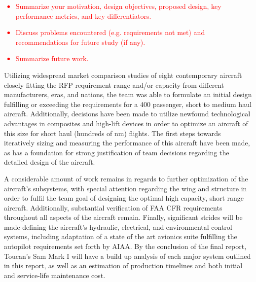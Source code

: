 \textcolor{red}{
\begin{itemize}
    \item Summarize your motivation, design objectives, proposed design, key performance metrics, and key differentiators. 
    \item Discuss problems encountered (e.g. requirements not met) and recommendations for future study (if any). 
    \item Summarize future work. 
\end{itemize}}

Utilizing widespread market comparison studies of eight contemporary aircraft closely fitting the RFP requirement range and/or capacity from different manufacturers, eras, and nations, the team was able to formulate an initial design fulfilling or exceeding the requirements for a 400 passenger, short to medium haul aircraft. Additionally, decisions have been made to utilize newfound technological advantages in composites and high-lift devices in order to optimize  an aircraft of this size for short haul (hundreds of nm) flights.  The first steps towards iteratively sizing and measuring the performance of this aircraft have been made, as has a foundation for strong justification of team decisions regarding the detailed design of the aircraft.

A considerable amount of work remains in regards to further optimization of the aircraft's subsystems, with special attention regarding the wing and structure in order to fulfil the team goal of designing the optimal high capacity, short range aircraft.  Additionally, substantial verification of FAA CFR requirements throughout all aspects of the aircraft remain.  Finally, significant strides will be made defining the aircraft's hydraulic, electrical, and environmental control systems, including adaptation of a state of the art avionics suite fulfilling the autopilot requirements set forth by AIAA.  By the conclusion of the final report, Toucan's Sam Mark I will have a build up analysis of each major system outlined in this report, as well as an estimation of production timelines and both initial and service-life maintenance cost. 